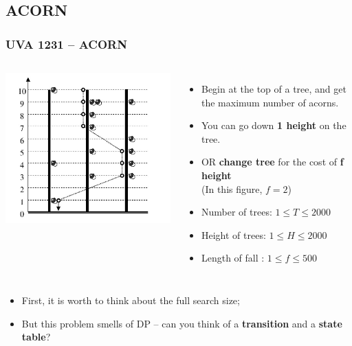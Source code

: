 \subsection{ACORN}
\begin{frame}
  \frametitle{UVA 1231 -- ACORN}

  {\smaller
  \begin{columns}
    \includegraphics[width=1.2\textwidth]{img/acorn}

    \begin{itemize}
    \item Begin at the top of a tree, and get the maximum number of acorns.
    \item You can go down {\bf 1 height} on the tree.
    \item OR {\bf change tree} for the cost of {\bf f height}\\
      (In this figure, $f = 2$)

      \bigskip

    \item Number of trees: $ 1 \leq T \leq 2000$
    \item Height of trees: $ 1 \leq H \leq 2000$
    \item Length of fall : $ 1 \leq f \leq 500$
    \end{itemize}
  \end{columns}

  \bigskip

  \begin{block}{}
    \begin{itemize}
      \item First, it is worth to think about the full search size;
      \item But this problem smells of DP -- can you think of a {\bf transition} and a {\bf state table}?
    \end{itemize}
  \end{block}
  }
\end{frame}

